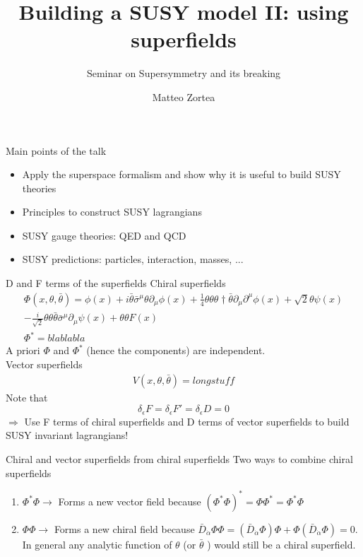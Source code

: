 \documentclass[10pt]{beamer}
\title{Building a SUSY model II: using superfields}
\subtitle{Seminar on Supersymmetry and its breaking}
\date{}
\author{Matteo Zortea}
\institute{Heidelberg Universit\"at, Department of Physics}
\begin{document}
\maketitle              

\begin{frame}{Main points of the talk}
\begin{itemize}
    \item Apply the superspace formalism and show why it is useful to build SUSY theories
    \vfill
    \item Principles to construct SUSY lagrangians 
    \vfill
    \item SUSY gauge theories: QED and QCD
    \vfill
    \item SUSY predictions: particles, interaction, masses, ...
\end{itemize}
\end{frame}

\begin{frame}{D and F terms of the superfields}
Chiral superfields
\begin{gather*}
    \Phi(x, \theta, \bar\theta) = \phi(x) + i\bar\theta \bar\sigma^{\mu}\theta \partial_{\mu}\phi(x) + \frac{1}{4}\theta\theta\theta{\dagger}\bar\theta\partial_{\mu}\partial^{\mu}\phi(x) + \sqrt{2}\theta\psi(x)\\ 
    -\frac{i}{\sqrt{2}}\theta\theta\bar\theta\bar\sigma^{\mu}\partial_{\mu}\psi(x) + \theta\theta F(x) \\
    \Phi^* = blablabla
\end{gather*}
A priori $\Phi$ and $\Phi^*$ (hence the components) are independent. \\
Vector superfields
\begin{gather*}
    V(x, \theta, \bar\theta) = long stuff
\end{gather*}
Note that
\begin{equation*}
    \delta_{\epsilon} F = \delta_{\epsilon} F' = \delta_{\epsilon} D = 0
\end{equation*}
$\Rightarrow$ Use F terms of chiral superfields and D terms of vector superfields to build SUSY invariant lagrangians!
    
\end{frame}

\begin{frame}{Chiral and vector superfields from chiral superfields}
Two ways to combine chiral superfields
\begin{enumerate}
    \item $\Phi^*\Phi \longrightarrow$ Forms a new vector field because $(\Phi^*\Phi)^* = \Phi\Phi^* = \Phi^*\Phi$ \\
    
    \item $\Phi \Phi \longrightarrow$ Forms a new chiral field because $\bar D_{\dot \alpha} \Phi \Phi = (\bar D_{\dot \alpha} \Phi) \Phi  + \Phi (\bar D_{\dot \alpha} \Phi) = 0$. \\
    In general any analytic function of $\theta$ (or $\bar \theta$ ) would still be a chiral superfield. \\
    
\end{enumerate}
\end{frame}
\end{document}

